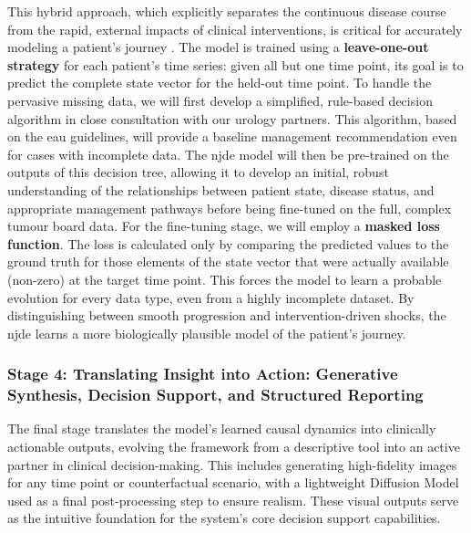 \documentclass[11pt, a4paper]{article}
\begin{document}
This hybrid approach, which explicitly separates the continuous disease course from the rapid, external impacts of clinical interventions, is critical for accurately modeling a patient's journey \cite{GwakSim2020}. The model is trained using a \textbf{leave-one-out strategy} for each patient's time series: given all but one time point, its goal is to predict the complete state vector for the held-out time point. To handle the pervasive missing data, we will first develop a simplified, rule-based decision algorithm in close consultation with our urology partners. This algorithm, based on the \gls{eau} guidelines, will provide a baseline management recommendation even for cases with incomplete data. The \gls{njde} model will then be pre-trained on the outputs of this decision tree, allowing it to develop an initial, robust understanding of the relationships between patient state, disease status, and appropriate management pathways before being fine-tuned on the full, complex tumour board data. For the fine-tuning stage, we will employ a \textbf{masked loss function}. The loss is calculated only by comparing the predicted values to the ground truth for those elements of the state vector that were actually available (non-zero) at the target time point. This forces the model to learn a probable evolution for every data type, even from a highly incomplete dataset. By distinguishing between smooth progression and intervention-driven shocks, the \gls{njde} learns a more biologically plausible model of the patient's journey.

\subsubsection{Stage 4: Translating Insight into Action: Generative Synthesis, Decision Support, and Structured Reporting}
The final stage translates the model's learned causal dynamics into clinically actionable outputs, evolving the framework from a descriptive tool into an active partner in clinical decision-making. This includes generating high-fidelity images for any time point or counterfactual scenario, with a lightweight Diffusion Model used as a final post-processing step to ensure realism. These visual outputs serve as the intuitive foundation for the system's core decision support capabilities.
\end{document}
